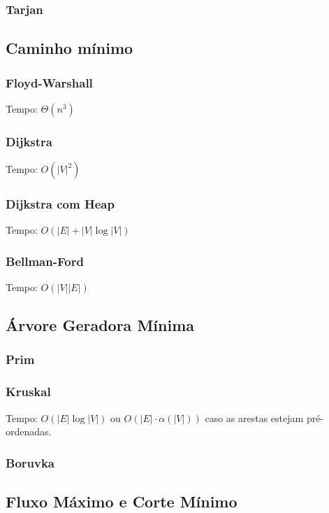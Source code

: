 \documentclass[12pt,a4paper]{article}
\begin{document}
			\subsubsection{Tarjan}
				
		\subsection{Caminho mínimo}
			\subsubsection{Floyd-Warshall}
				Tempo: \( \Theta(n^3)\)
				
			\subsubsection{Dijkstra}
				Tempo: \( O(|V|^2) \)
				
			\subsubsection{Dijkstra com Heap}
				Tempo: \( O(|E| + |V| \log |V|) \)
			\subsubsection{Bellman-Ford}
				Tempo: \( O(|V| |E|) \)
				
		\subsection{Árvore Geradora Mínima}
			\subsubsection{Prim}
			\subsubsection{Kruskal}
				Tempo: \( O(|E| \log |V|) \) ou \( O(|E| \cdot \alpha(|V|)) \) caso as arestas estejam pré-ordenadas.
				
			\subsubsection{Boruvka}
		\subsection{Fluxo Máximo e Corte Mínimo}
\end{document}
